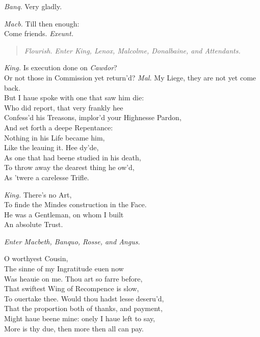 \documentclass[12pt]{sides}
\newcommand{\StageDir}[1]{\begin{quote}\centering\em #1\end{quote}}
\newcommand{\dia}[1]{\hskip 15pt\textit{#1}\hskip 6pt}
\begin{document}
\begin{multicols}{2}
            \dia{Banq.} Very gladly.

            \dia{Macb.} Till then enough: \\ Come friends. \hspace*{\fill}\textit{Exeunt.}\hspace*{\fill}

            \StageDir{Flourish. Enter King, Lenox, Malcolme, Donalbaine, and Attendants.}

            \dia{King.} Is execution done on \textit{Cawdor}? \\ Or not those in Commission yet return'd?
            \newline
            \dia{Mal.} My Liege, they are not yet come back. \\ But I haue spoke with one that saw him die: \\ Who did report, that very frankly hee \\ Confess'd his Treasons, implor'd your Highnesse Pardon, \\ And set forth a deepe Repentance: \\ Nothing in his Life became him, \\ Like the leauing it. Hee dy'de, \\ As one that had beene studied in his death, \\ To throw away the dearest thing he ow'd, \\ As 'twere a carelesse Trifle. %

            \dia{King.} There's no Art, \\ To finde the Mindes construction in the Face. \\ He was a Gentleman, on whom I built \\ An absolute Trust.

            \centerline{\textit{Enter Macbeth, Banquo, Rosse, and Angus.}}
            O worthyest Cousin, \\ The sinne of my Ingratitude euen now \\ Was heauie on me. Thou art so farre before, \\ That swiftest Wing of Recompence is slow, \\ To ouertake thee. Would thou hadst lesse deseru'd, \\ That the proportion both of thanks, and payment, \\ Might haue beene mine: onely I haue left to say, \\ More is thy due, then more then all can pay.


\end{multicols}
\end{document}
